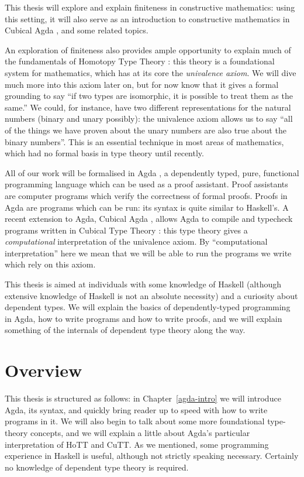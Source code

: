 This thesis will explore and explain finiteness in constructive
mathematics: using this setting, it will also serve as an introduction to
constructive mathematics in Cubical Agda
\citep{vezzosiCubicalAgdaDependently2019}, and some related topics.

An exploration of finiteness also provides ample opportunity to explain much of
the fundamentals of Homotopy Type Theory \citep{hottbook}: this theory is a
foundational system for mathematics, which has at its core the \emph{univalence
  axiom}.
We will dive much more into this axiom later on, but for now know that it gives
a formal grounding to say ``if two types are isomorphic, it is possible to treat
them as the same.''
We could, for instance, have two different representations for the natural
numbers (binary and unary possibly): the univalence axiom allows us to say ``all
of the things we have proven about the unary numbers are also true about the
binary numbers''.
This is an essential technique in most areas of mathematics, which
had no formal basis in type theory until recently.

All of our work will be formalised in Agda
\citep{norellDependentlyTypedProgramming2008}, a
dependently typed, pure, functional programming language which can be
used as a proof assistant.
Proof assistants are computer programs which verify the correctness of formal
proofs.
Proofs in Agda are programs which can be run: its syntax is quite similar to
Haskell's.
A recent extension to Agda, Cubical Agda
\citep{vezzosiCubicalAgdaDependently2019}, allows Agda to compile and typecheck
programs written in Cubical Type Theory \citep{cohenCubicalTypeTheory2016}: this
type theory gives a \emph{computational} interpretation of the univalence axiom.
By ``computational interpretation'' here we mean that we will be able to run the
programs we write which rely on this axiom.

This thesis is aimed at individuals with some knowledge of Haskell (although
extensive knowledge of Haskell is not an absolute necessity) and a curiosity
about dependent types.
We will explain the basics of dependently-typed programming in Agda, how to
write programs and how to write proofs, and we will explain something of the
internals of dependent type theory along the way.
\section{Overview}
This thesis is structured as follows: in Chapter~\ref{agda-intro} we will
introduce Agda, its syntax, and quickly bring reader up to speed with how to
write programs in it.
We will also begin to talk about some more foundational type-theory concepts,
and we will explain a little about Agda's particular interpretation of HoTT and
CuTT.
As we mentioned, some programming experience in Haskell is useful, although not
strictly speaking necessary.
Certainly no knowledge of dependent type theory is required.

